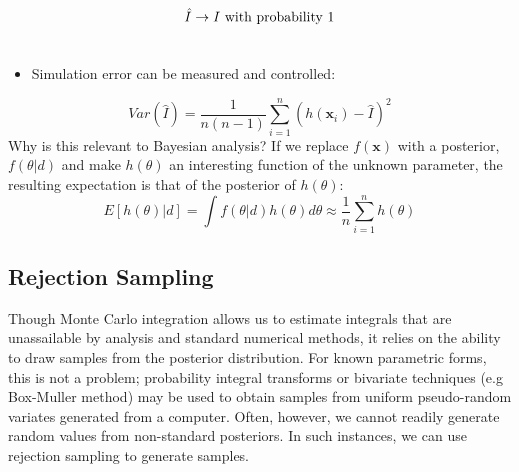 \documentclass[letterpaper,10pt,english]{sphinxmanual}
\begin{document}
\begin{gather}
\begin{split}\hat{I} \rightarrow I   \mbox{   with probability 1}\end{split}\notag\\\begin{split}\end{split}\notag
\end{gather}\begin{itemize}
\item {} 
Simulation error can be measured and controlled:

\end{itemize}
   \begin{equation}Var(\hat{I}) = \frac{1}{n(n-1)}\sum_{i=1}^n (h(\mathbf{x}_i)-\hat{I})^2\end{equation}
Why is this relevant to Bayesian analysis? If we replace $f(\mathbf{x})$ with a posterior, $f(\theta|d)$ and make $h(\theta)$ an interesting function of the unknown parameter, the resulting expectation is that of the posterior of $h(\theta)$:
 \begin{equation}
 E[h(\theta)|d] = \int f(\theta|d) h(\theta) d\theta \approx \frac{1}{n}\sum_{i=1}^n h(\theta)
 \end{equation}

\subsection{Rejection Sampling}
\label{theory:rejection-sampling}
Though Monte Carlo integration allows us to estimate integrals that are unassailable by analysis and standard numerical methods, it relies on the  ability to draw samples from the posterior distribution. For known parametric forms, this is not a problem; probability integral transforms or bivariate techniques (e.g Box-Muller method) may be used to obtain samples from uniform pseudo-random variates generated from a computer. Often, however, we cannot readily generate random values from non-standard posteriors. In such instances, we can use rejection sampling to generate samples.
\end{document}
